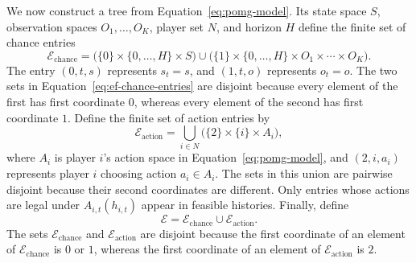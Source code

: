 We now construct a tree from Equation~\eqref{eq:pomg-model}. Its state space $S$, observation spaces $O_1,\ldots,O_K$, player set $N$, and horizon $H$ define the finite set of chance entries
\begin{equation}
\label{eq:ef-chance-entries}
    \mathcal{E}_{\mathrm{chance}}
    =
    \bigl(\{0\}\times\{0,\ldots,H\}\times S\bigr)
    \cup
    \bigl(\{1\}\times\{0,\ldots,H\}
      \times O_1\times\cdots\times O_K\bigr).
\end{equation}
The entry $(0,t,s)$ represents $s_t=s$, and $(1,t,o)$ represents $o_t=o$. The two sets in Equation~\eqref{eq:ef-chance-entries} are disjoint because every element of the first has first coordinate $0$, whereas every element of the second has first coordinate $1$. Define the finite set of action entries by
\begin{equation}
\label{eq:ef-action-entries}
    \mathcal{E}_{\mathrm{action}}
    =
    \bigcup_{i\in N}
    \bigl(\{2\}\times\{i\}\times A_i\bigr),
\end{equation}
where $A_i$ is player $i$'s action space in Equation~\eqref{eq:pomg-model}, and $(2,i,a_i)$ represents player $i$ choosing action $a_i\in A_i$. The sets in this union are pairwise disjoint because their second coordinates are different. Only entries whose actions are legal under $A_{i,t}(h_{i,t})$ appear in feasible histories. Finally, define
\begin{equation}
\label{eq:ef-entry-set}
    \mathcal{E}=\mathcal{E}_{\mathrm{chance}}\cup\mathcal{E}_{\mathrm{action}}.
\end{equation}
The sets $\mathcal{E}_{\mathrm{chance}}$ and $\mathcal{E}_{\mathrm{action}}$ are disjoint because the first coordinate of an element of $\mathcal{E}_{\mathrm{chance}}$ is $0$ or $1$, whereas the first coordinate of an element of $\mathcal{E}_{\mathrm{action}}$ is $2$.

